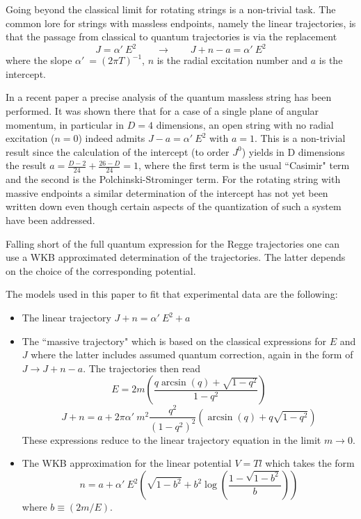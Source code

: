 \documentclass[11pt,a4]{article}
\def\be{\begin{equation}}
\def\ee{\end{equation}}
\newcommand{\alp}{\ensuremath{\alpha'\:}}
\begin{document}
Going beyond the classical limit for rotating strings is a non-trivial task. The common lore for strings with massless endpoints, namely the linear trajectories, is that the passage from classical to quantum  trajectories is via the replacement
\be
J = \alp E^2 \qquad \rightarrow \qquad J + n - a = \alp E^2
\ee
where the slope  $\alp = (2\pi T)^{-1}$, $n$ is the radial excitation number and $a$ is the intercept.


In a recent paper\cite{Hellerman:2013kba} a precise analysis of the quantum massless string has been performed. It was shown there that for a case of a single plane of angular momentum, in particular in $D=4$ dimensions, an open string with no radial excitation ($n=0$) indeed admits $J - a = \alp E^2$ with $a=1$. This is a non-trivial result since the calculation of the intercept (to order $J^0$) yields in D dimensions the result $ a = \frac{D-2}{24} + \frac{26-D}{24} =1$, where the first term is the usual ``Casimir" term and the second is the Polchinski-Strominger term. For the rotating string with massive endpoints a similar determination of the intercept has not yet been written down even though certain aspects of the quantization of such a system have been addressed\cite{Chodos:1973gt}\cite{Baker:2002km}\cite{Zahn:2013yma}.


Falling short of the full quantum expression for the Regge trajectories one can use a WKB approximated determination of the trajectories\cite{Schreiber:2004ie}. The latter depends on the choice of the corresponding potential.


The models used in this paper to fit that experimental data are the following:

\begin{itemize}
\item The linear trajectory   $J + n = \alp E^2 +a $
\item The ``massive trajectory" which is based on the classical expressions for $E$ and $J$ where the latter includes assumed quantum correction, again in the form of $J\rightarrow J+n-a$. The trajectories then read
	\be E = 2m\left(\frac{q\arcsin(q)+\sqrt{1-q^2}}{1-q^2}\right) \ee
	\be J + n = a + 2\pi\alp m^2\frac{q^2}{(1-q^2)^2}\left(\arcsin(q)+q\sqrt{1-q^2}\right)   \ee
	These expressions reduce to the linear trajectory equation in the limit \(m \rightarrow 0\).
\item The WKB approximation for the linear potential $V=Tl$ which takes the form
	\be n = a + \alp E^2 \left(\sqrt{1-b^2}+b^2\log\left(\frac{1-\sqrt{1-b^2}}{b}\right)\right) \ee
where  $b \equiv (2m/E)$.
\end{itemize}
\end{document}
